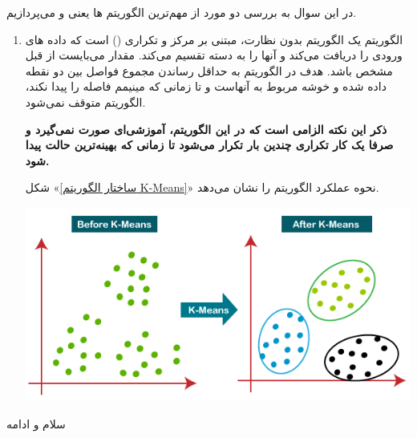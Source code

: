 \begin{enumerate}
\begin{qsolve}
	در این سوال به بررسی دو مورد از مهم‌ترین الگوریتم ها یعنی  و  می‌پردازیم.
	
	\begin{enumerate}
		\item {}
		الگوریتم  یک الگوریتم بدون نظارت، مبتنی بر مرکز و تکراری () است که داده های ورودی را دریافت می‌کند و آنها را به  دسته تقسیم می‌کند. مقدار  می‌بایست از قبل مشخص باشد. هدف در الگوریتم  به حداقل رساندن مجموع فواصل بین دو نقطه داده شده و خوشه مربوط به آنهاست و تا زمانی که مینیمم فاصله را پیدا نکند، الگوریتم متوقف نمی‌شود.
		
		\textbf{ذکر این نکته الزامی است که در این الگوریتم، آموزشی‌ای صورت نمی‌گیرد و صرفا یک کار تکراری چندین بار تکرار می‌شود تا زمانی که بهینه‌ترین حالت پیدا شود.}
		
		شکل «\ref{ساختار الگوریتم K-Means}» نحوه عملکرد الگوریتم  را نشان می‌دهد.
	
	
	\begin{center}
		\includegraphics*[width=0.7\linewidth]{pics/img2.png}
		\label{ساختار الگوریتم K-Means}
	\end{center}
	
	
	\end{enumerate}
	
\end{qsolve}
	
	
	
\begin{qsolve}
	\begin{enumerate}
		سلام و ادامه 
	\end{enumerate}
	
\end{qsolve}
	
	
	
	
	
	
	
	
	
	
	
	
	

\end{enumerate}
